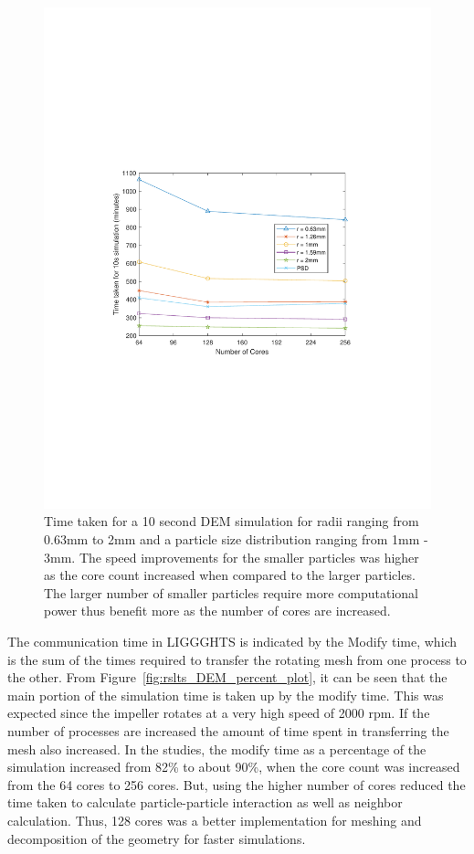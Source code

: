\documentclass[preprint,11pt,authoryear]{elsarticle}
\begin{document}
\begin{figure}
\centering
\includegraphics[scale=0.7]{rslsts_DEM_alldia_timing_mtlb.pdf}
\caption{ Time taken for a 10 second DEM simulation for radii ranging from
 0.63mm to 2mm and a particle size distribution ranging from 1mm - 3mm. The speed improvements 
 for the smaller particles was higher as the core count increased when compared to the larger particles. 
 The larger number of smaller particles require more computational power thus benefit more as the number 
 of cores are increased. }
\label{fig:rslts_DEM_timing_studies}
\end{figure}

The communication time in LIGGGHTS is indicated by the Modify time, which is the sum of the 
times required to transfer the rotating mesh from one process to the other. From Figure~\ref{fig:rslts_DEM_percent_plot}, it can be seen that the main portion of the simulation time is taken up by 
the modify time. This was expected since the impeller rotates at a very high speed of 2000 rpm. If 
the number of processes are increased the amount of time spent in transferring the mesh also 
increased. In the studies, the modify time as a percentage of the simulation increased from 82\% to 
about 90\%, when the core count was increased from the 64 cores to 256 cores. But, using the 
higher number of cores reduced the time taken to calculate particle-particle interaction as well as  
neighbor calculation. Thus, 128 cores was a better implementation for meshing and decomposition of the 
geometry for faster simulations.
\end{document}
